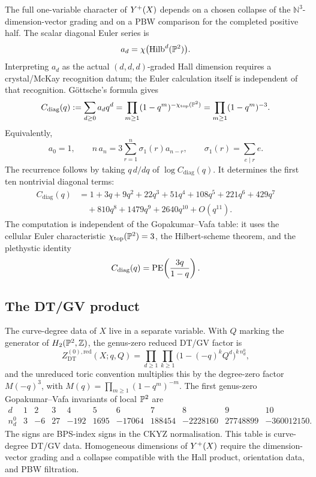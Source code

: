 The full one-variable character of \(\Yplus(X)\) depends on a chosen
collapse of the \(\mathbb N^3\)-dimension-vector grading and on a PBW
comparison for the completed positive half. The scalar diagonal Euler
series is
\[
 a_d=\chi\bigl(\Hilb^d(\P^2)\bigr).
\]
Interpreting \(a_d\) as the actual \((d,d,d)\)-graded Hall dimension
requires a crystal/McKay recognition datum; the Euler
calculation itself is independent of that recognition.
G\"ottsche's formula gives
\[
 C_{\mathrm{diag}}(q)
 :=\sum_{d\ge 0}a_dq^d
 =\prod_{m\ge 1}(1-q^m)^{-\chi_{\mathrm{top}}(\P^2)}
 =\prod_{m\ge 1}(1-q^m)^{-3}.
\]
Equivalently,
\[
 a_0=1,\qquad
 n\,a_n=3\sum_{r=1}^{n}\sigma_1(r)a_{n-r},
 \qquad
 \sigma_1(r)=\sum_{e\mid r}e.
\]
The recurrence follows by taking \(q\,d/dq\) of
\(\log C_{\mathrm{diag}}(q)\). It determines the first ten nontrivial
diagonal terms:
\[
\begin{aligned}
 C_{\mathrm{diag}}(q)
 &=1+3q+9q^2+22q^3+51q^4+108q^5
   +221q^6+429q^7  \\
 &\quad +810q^8+1479q^9+2640q^{10}+O(q^{11}).
\end{aligned}
\]
The computation is independent of the Gopakumar--Vafa table: it uses
the cellular Euler characteristic \(\chi_{\mathrm{top}}(\P^2)=3\), the
Hilbert-scheme theorem, and the plethystic identity
\[
 C_{\mathrm{diag}}(q)=\PE\!\left(\frac{3q}{1-q}\right).
\]

\subsection*{The DT/GV product}

The curve-degree data of \(X\) live in a separate variable. With \(Q\)
marking the generator of \(H_2(\P^2,\Z)\), the genus-zero reduced
DT/GV factor is
\[
 Z_{\mathrm{DT}}^{(0),\mathrm{red}}(X;q,Q)
 =
  \prod_{d\ge 1}\prod_{k\ge 1}
  \bigl(1-(-q)^kQ^d\bigr)^{k\,n_d^0},
\]
and the unreduced toric convention multiplies this by the degree-zero
factor \(M(-q)^3\), with \(M(q)=\prod_{m\ge 1}(1-q^m)^{-m}\). The
first genus-zero Gopakumar--Vafa invariants of local \(\P^2\) are
\[
\begin{array}{c|rrrrrrrrrr}
d&1&2&3&4&5&6&7&8&9&10\\
\hline
n_d^0&3&-6&27&-192&1695&-17064&188454&-2228160&
27748899&-360012150 .
\end{array}
\]
The signs are BPS-index signs in the CKYZ normalisation. This table is
curve-degree DT/GV data. Homogeneous dimensions of \(\Yplus(X)\) require
the dimension-vector grading and a collapse compatible with the Hall
product, orientation data, and PBW filtration.

